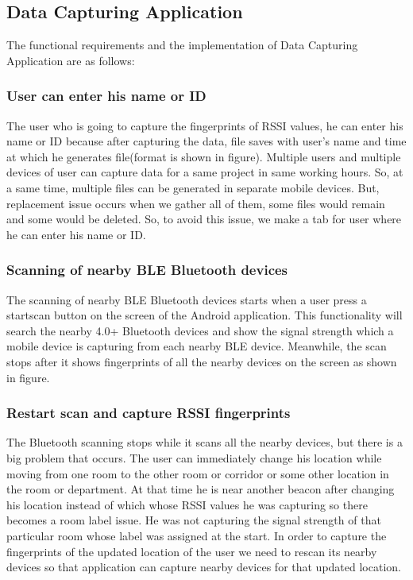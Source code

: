 \subsection{Data Capturing Application}
The functional requirements and the implementation of Data Capturing Application are as follows:
\subsubsection{User can enter his name or ID}
The user who is going to capture the fingerprints of RSSI values, he can enter his name or ID because after capturing the data, file saves with user’s name and time at which he generates file(format is shown in figure). Multiple users and multiple devices of user can capture data for a same project in same working hours. So, at a same time, multiple files can be generated in separate mobile devices. But, replacement issue occurs when we gather all of them, some files would remain and some would be deleted. So, to avoid this issue, we make a tab for user where he can enter his name or ID.
\subsubsection{Scanning of nearby BLE Bluetooth devices}
The scanning of nearby BLE Bluetooth devices starts when a user press a startscan button on the screen of the Android application. This functionality will search the nearby 4.0+ Bluetooth devices and show the signal strength which a mobile device is capturing from each nearby BLE device. Meanwhile, the scan stops after it shows fingerprints of all the nearby devices on the screen as shown in figure.
\subsubsection{Restart scan and capture RSSI fingerprints}
The Bluetooth scanning stops while it scans all the nearby devices, but there is a big problem that occurs. The user can immediately change his location while moving from one room to the other room or corridor or some other location in the room or department. At that time he is near another beacon after changing his location instead of which whose RSSI values he was capturing so there becomes a room label issue. He was not capturing the signal strength of that particular room whose label was assigned at the start. In order to capture the fingerprints of the updated location of the user we need to rescan its nearby devices so that application can capture nearby devices for that updated location.
